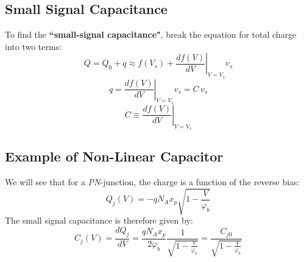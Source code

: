 \subsection{Small Signal Capacitance}
To find the \textbf{``small-signal capacitance"}, break the equation for total charge into two terms:
    \begin{equation} 
        Q = {Q_0} + q \approx f({V_s}) + {\left. {\frac{{df(V)}}{{dV}}} \right|_{V = {V_s}}}{v_s} 
    \end{equation}
    \begin{equation} 
        q = {\left. {\frac{{df(V)}}{{dV}}} \right|_{V = {V_s}}}{v_s} = C\,{v_s} 
    \end{equation}
    \begin{equation} 
        C \equiv {\left. {\frac{{df(V)}}{{dV}}} \right|_{V = {V_s}}} 
    \end{equation}
\subsection{Example of Non-Linear Capacitor}
We will see that for a \emph{PN}-junction, the charge is a function of the reverse bias:
    \begin{equation} 
        {Q_j}(V) =  - q{N_A}{x_p}\sqrt {1 - \frac{V}{{{\varphi _b}}}} 
    \end{equation}
The small signal capacitance is therefore given by:
    \begin{equation} 
        {C_j}(V) = \frac{{dQ_j^{}}}{{dV}} = \frac{{q{N_A}{x_p}}}{{2{\varphi _b}}}\frac{1}{{\sqrt {1 - \frac{V}{{{\varphi _b}}}}}} = \frac{{C_{j0}^{}}}{{\sqrt {1 - \frac{V}{{{\varphi _b}}}}}} 
    \end{equation}
